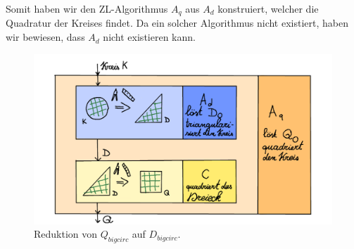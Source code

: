 \documentclass[
	12pt, %
	german, %
]{fphw}
\begin{document}
Somit haben wir den ZL-Algorithmus \(A_q\) aus \(A_d\) konstruiert, welcher die Quadratur der Kreises findet. Da ein solcher Algorithmus nicht existiert, haben wir bewiesen, dass \(A_d\) nicht existieren kann.
\begin{figure}[H]
	\centering
	\includegraphics[width=\textwidth]{Negativ.png}
	\caption{Reduktion von \(Q_{bigcirc}\) auf \(D_{bigcirc}\).}
\end{figure}
\end{document}
